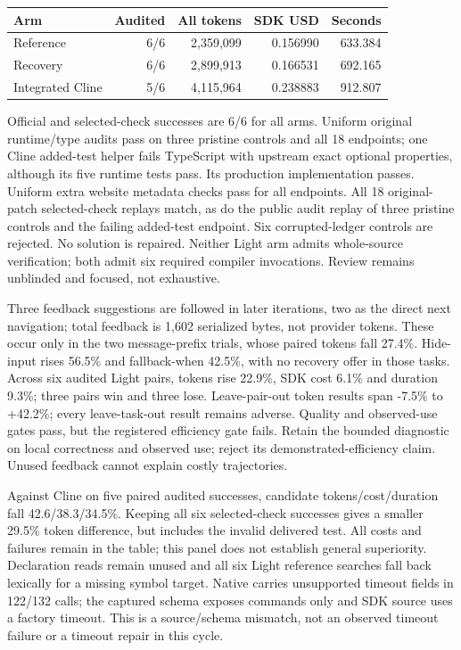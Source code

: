 \documentclass[11pt,a4paper]{article}
\newcommand{\code}[1]{\texttt{\detokenize{#1}}}
\begin{document}
\begin{center}\small\begin{tabular}{lrrrr}\toprule
Arm & Audited & All tokens & SDK USD & Seconds\\\midrule
Reference &6/6&2,359,099&0.156990&633.384\\
Recovery &6/6&2,899,913&0.166531&692.165\\
Integrated Cline &5/6&4,115,964&0.238883&912.807\\\bottomrule
\end{tabular}\end{center}
Official and selected-check successes are 6/6 for all arms. Uniform original
runtime/type audits pass on three pristine controls and all 18 endpoints; one
Cline added-test helper fails TypeScript with upstream exact optional properties,
although its five runtime tests pass. Its production implementation passes.
Uniform extra website metadata checks pass for all endpoints. All 18 original-patch selected-check replays match, as do the public audit
replay of three pristine controls and the failing added-test endpoint. Six
corrupted-ledger controls are rejected. No solution is repaired. Neither Light arm admits whole-source verification; both admit six
required compiler invocations. Review remains unblinded and focused, not exhaustive.

Three feedback suggestions are followed in later iterations, two as the direct
next navigation; total feedback is 1,602 serialized bytes, not provider tokens.
These occur only in the two message-prefix trials, whose paired tokens fall
27.4\%. Hide-input rises 56.5\% and fallback-when 42.5\%, with no recovery offer
in those tasks. Across six audited Light pairs, tokens rise 22.9\%, SDK cost
6.1\% and duration 9.3\%; three pairs win and three lose. Leave-pair-out token
results span -7.5\% to +42.2\%; every leave-task-out result remains adverse.
Quality and observed-use gates pass, but the registered efficiency gate fails.
Retain the bounded diagnostic on local correctness and observed use; reject
its demonstrated-efficiency claim. Unused feedback cannot explain costly trajectories.

Against Cline on five paired audited successes, candidate tokens/cost/duration
fall 42.6/38.3/34.5\%. Keeping all six selected-check successes gives a smaller
29.5\% token difference, but includes the invalid delivered test. All costs and
failures remain in the table; this panel does not establish general superiority.
Declaration reads remain unused and all six Light reference searches fall back
lexically for a missing symbol target. Native \code{run_commands} carries
unsupported timeout fields in 122/132 calls; the captured schema exposes commands
only and SDK source uses a factory timeout. This is a source/schema mismatch,
not an observed timeout failure or a timeout repair in this cycle.
\end{document}

